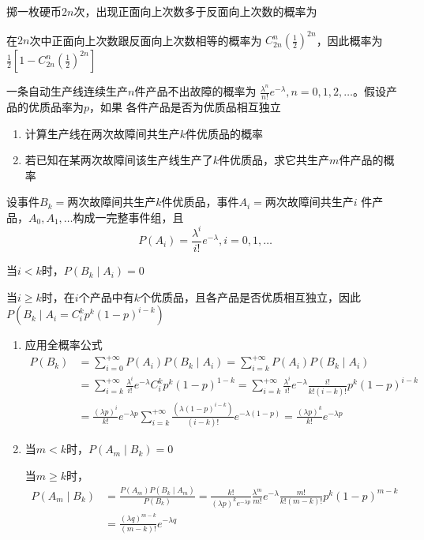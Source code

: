 \documentclass{article}
\begin{document}
\begin{examplle}[]
掷一枚硬币\(2n\)次，出现正面向上次数多于反面向上次数的概率为

在\(2n\)次中正面向上次数跟反面向上次数相等的概率为
\(C_{2n}^n(\frac{1}{2})^{2n}\)，因此概率为\(\frac{1}{2}[1-C_{2n}^n(\frac{1}{2})^{2n}]\)
\end{examplle}

\begin{examplle}[]
一条自动生产线连续生产\(n\)件产品不出故障的概率为
\(\frac{\lambda^n}{n!}e^{-\lambda},n=0,1,2,\dots\)。假设产品的优质品率为\(p\)，如果
各件产品是否为优质品相互独立
\begin{enumerate}
\item 计算生产线在两次故障间共生产\(k\)件优质品的概率
\item 若已知在某两次故障间该生产线生产了\(k\)件优质品，求它共生产\(m\)件产品的概
率
\end{enumerate}


设事件\(B_k=\)两次故障间共生产\(k\)件优质品，事件\(A_i=\)两次故障间共生产\(i\)
件产品，\(A_0,A_1,\dots\)构成一完整事件组，且
\begin{equation*}
P(A_i)=\frac{\lambda^i}{i!}e^{-\lambda},i=0,1,\dots
\end{equation*}

当\(i<k\)时，\(P(B_k\mid A_i)=0\)

当\(i\ge k\)时，在\(i\)个产品中有\(k\)个优质品，且各产品是否优质相互独立，因此
\(P(B_k\mid A_i=C_i^kp^k(1-p)^{i-k})\)

\begin{enumerate}
\item 应用全概率公式
\begin{align*}
P(B_k)&=\sum_{i=0}^{+\infty}P(A_i)P(B_k\mid A_i)=\sum_{i=k}^{ +\infty}
P(A_i)P(B_k\mid A_i)\\&=\sum_{i=k}^{ +\infty}\frac{\lambda^i}{i!}e^{-\lambda}C_i^kp^k(1-p)^{1-k}
=\sum_{i=k}^{ +\infty}\frac{\lambda^i}{i!}e^{-\lambda}\frac{i!}{k!(i-k)!}p^k(1-p)^{i-k}\\
&=\frac{(\lambda p)^i}{k!}e^{-\lambda p}\sum_{i=k}^{ +\infty}
\frac{(\lambda(1-p)^{i-k})}{(i-k)!}e^{-\lambda (1-p)}=
\frac{(\lambda p)^k}{k!}e^{-\lambda p}
\end{align*}
\item 当\(m<k\)时，\(P(A_m\mid B_k)=0\)

当\(m\ge k\)时，
\begin{align*}
P(A_m\mid B_k)&=\frac{P(A_m)P(B_k\mid A_m)}{P(B_k)}=
\frac{k!}{(\lambda p)^ke^{-\lambda p}}\frac{\lambda^m}{m!}e^{-\lambda}
\frac{m!}{k!(m-k)!}p^k(1-p)^{m-k}\\
&=\frac{(\lambda q)^{m-k}}{(m-k)!}e^{-\lambda q}
\end{align*}
\end{enumerate}
\end{examplle}
\end{document}
